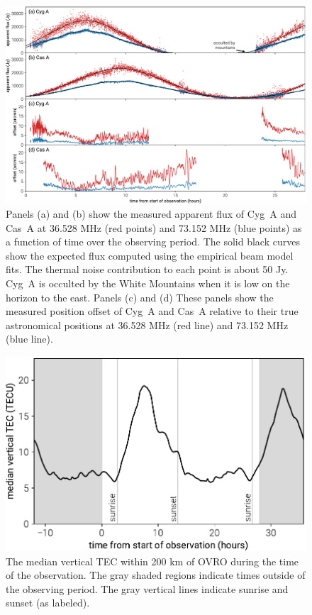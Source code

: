 \documentclass[twocolumn]{aastex61}
\begin{document}
\begin{figure}[t]
    \includegraphics[width=\textwidth]{figures/scintillation-refraction/scintillation-refraction}
    \caption{
        Panels (a) and (b) show the measured apparent flux of Cyg~A and Cas~A at 36.528 MHz (red
        points) and 73.152 MHz (blue points) as a function of time over the observing period. The
        solid black curves show the expected flux computed using the empirical beam model fits. The
        thermal noise contribution to each point is about 50 Jy.  Cyg~A is occulted by the White
        Mountains when it is low on the horizon to the east.
        Panels (c) and (d) These panels show the measured position offset of Cyg~A and Cas~A
        relative to their true astronomical positions at 36.528 MHz (red line) and 73.152 MHz (blue
        line).
    }
    \label{fig:scintillation}
\end{figure}

\begin{figure}[t]
    \includegraphics[width=\columnwidth]{figures/vtec/vtec}
    \caption{
        The median vertical TEC within 200 km of OVRO during the time of the observation. The gray
        shaded regions indicate times outside of the observing period. The gray vertical lines
        indicate sunrise and sunset (as labeled).
    }
    \label{fig:vtec}
\end{figure}
\end{document}
